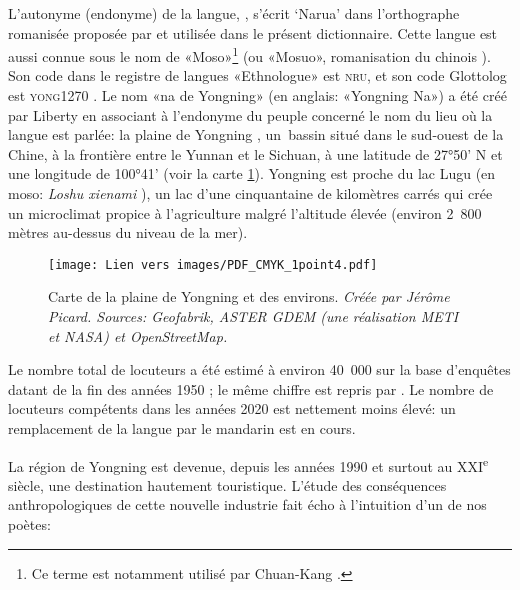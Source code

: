 L'autonyme (endonyme) de la langue, , s'écrit ‘Narua’ dans l'orthographe romanisée proposée par \cite{dobbs_ortho_2018} et utilisée dans le présent dictionnaire. Cette langue est aussi connue sous le nom de «Moso»\footnote{Ce terme est notamment utilisé par Chuan-Kang \cite[][]{shih1993,shih2010}.} (ou «Mosuo», romanisation du chinois ). Son code dans le registre de langues «Ethnologue»  \parencite{lewisetal2016} est \textsc{nru},
et son code Glottolog est \textsc{yong1270} \parencite{Nordhoff2012}. %
Le nom «na de Yongning» (en anglais: «Yongning Na») a été créé par Liberty \textcite{lidz2006} en associant à l'endonyme du peuple concerné le nom du lieu où la langue est parlée: la plaine de Yongning , un~bassin situé dans le sud-ouest de la Chine, à la frontière entre le Yunnan et le Sichuan, à une latitude de 27°50' N et une longitude de 100°41' (voir la carte \ref{map:1-1}). Yongning est proche du lac Lugu  (en moso: \emph{Loshu xienami} ), un lac d'une cinquantaine de kilomètres carrés qui crée un microclimat propice à l'agriculture malgré l'altitude élevée (environ 2~800 mètres au-dessus du niveau de la mer).

\begin{figure}
	\centering
	\caption{Carte de la plaine de Yongning et des environs. \emph{Créée par Jérôme Picard. Sources: Geofabrik, ASTER GDEM (une réalisation METI et NASA) et OpenStreetMap.}}
	\texttt{[image: Lien vers images/PDF\_CMYK\_1point4.pdf]}
	\label{map:1-1}
\end{figure}

Le nombre total de locuteurs a été estimé à environ 40~000 sur la base d'enquêtes datant de la fin des années 1950 \parencite[107]{heetal1985}; le même chiffre est repris par \parencite{yang2009}. Le nombre de locuteurs compétents dans les années 2020 est nettement moins élevé: un remplacement de la langue par le mandarin est en cours.

La région de Yongning est devenue, depuis les années 1990 et surtout au XXI\textsuperscript{e} siècle, une destination hautement touristique. L'étude des conséquences anthropologiques de cette nouvelle industrie \parencite{milan_tourisme_2019} fait écho à l'intuition d'un de nos poètes:

